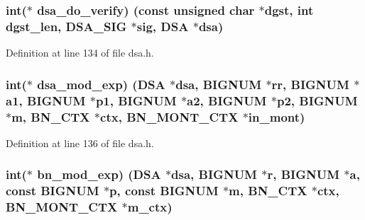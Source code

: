 \subsubsection[{\texorpdfstring{dsa\+\_\+do\+\_\+verify}{dsa_do_verify}}]{\setlength{\rightskip}{0pt plus 5cm}int($\ast$ dsa\+\_\+do\+\_\+verify) (const unsigned char $\ast$dgst, int dgst\+\_\+len, {\bf D\+S\+A\+\_\+\+S\+IG} $\ast$sig, {\bf D\+SA} $\ast$dsa)}\hypertarget{structdsa__method_a28873c19e7180892d8084c85baf67976}{}\label{structdsa__method_a28873c19e7180892d8084c85baf67976}


Definition at line 134 of file dsa.\+h.

\subsubsection[{\texorpdfstring{dsa\+\_\+mod\+\_\+exp}{dsa_mod_exp}}]{\setlength{\rightskip}{0pt plus 5cm}int($\ast$ dsa\+\_\+mod\+\_\+exp) ({\bf D\+SA} $\ast$dsa, {\bf B\+I\+G\+N\+UM} $\ast$rr, {\bf B\+I\+G\+N\+UM} $\ast$a1, {\bf B\+I\+G\+N\+UM} $\ast$p1, {\bf B\+I\+G\+N\+UM} $\ast$a2, {\bf B\+I\+G\+N\+UM} $\ast$p2, {\bf B\+I\+G\+N\+UM} $\ast$m, {\bf B\+N\+\_\+\+C\+TX} $\ast$ctx, {\bf B\+N\+\_\+\+M\+O\+N\+T\+\_\+\+C\+TX} $\ast$in\+\_\+mont)}\hypertarget{structdsa__method_a7ce3ad12cefddeceb1cd1e18b6d95f78}{}\label{structdsa__method_a7ce3ad12cefddeceb1cd1e18b6d95f78}


Definition at line 136 of file dsa.\+h.

\subsubsection[{\texorpdfstring{bn\+\_\+mod\+\_\+exp}{bn_mod_exp}}]{\setlength{\rightskip}{0pt plus 5cm}int($\ast$ bn\+\_\+mod\+\_\+exp) ({\bf D\+SA} $\ast$dsa, {\bf B\+I\+G\+N\+UM} $\ast$r, {\bf B\+I\+G\+N\+UM} $\ast${\bf a}, const {\bf B\+I\+G\+N\+UM} $\ast${\bf p}, const {\bf B\+I\+G\+N\+UM} $\ast$m, {\bf B\+N\+\_\+\+C\+TX} $\ast$ctx, {\bf B\+N\+\_\+\+M\+O\+N\+T\+\_\+\+C\+TX} $\ast$m\+\_\+ctx)}\hypertarget{structdsa__method_aa81dbd46b4a026034269067431c7452c}{}\label{structdsa__method_aa81dbd46b4a026034269067431c7452c}


